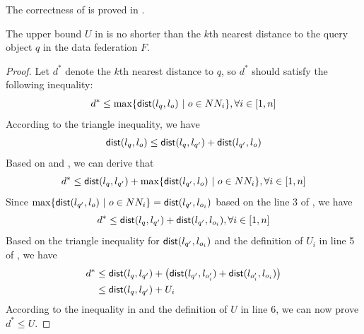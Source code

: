The correctness of  is proved in .
\begin{lemma}\label{lem:knn-UB}
    The upper bound $U$ in  is no shorter than the $k$th nearest distance to the query object $q$ in the data federation $F$.
\end{lemma}
\begin{proof}
    Let $d^*$ denote the $k$th nearest distance to $q$, so $d^*$ should satisfy the following inequality:
    \begin{equation}\label{equ:knn-UB-1}
        d^* \le \max\{\textsf{dist}(l_q, l_{o})\ |\ o \in NN_i\}, \forall i \in [1,n] 
    \end{equation}
    According to the triangle inequality, we have
    \begin{equation}\label{equ:knn-UB-2}
        \textsf{dist}(l_q, l_{o}) \le \textsf{dist}(l_q, l_{q'}) + \textsf{dist}(l_{q'}, l_{o})
    \end{equation}
    Based on  and , we can derive that
    \begin{equation*}\label{equ:knn-UB-3}
        d^* \le \textsf{dist}(l_q, l_{q'}) + \max\{\textsf{dist}(l_{q'}, l_{o})\ |\ o \in NN_i\}, \forall i \in [1,n] 
    \end{equation*}
    Since $\max\{\textsf{dist}(l_{q'}, l_{o})\ |\ o \in NN_i\} = \textsf{dist}(l_{q'}, l_{o_i})$ based on the line 3 of , we have
    \begin{equation*}\label{equ:knn-UB-4}
        d^* \le \textsf{dist}(l_q, l_{q'}) + \textsf{dist}(l_{q'}, l_{o_i}), \forall i \in [1,n] 
    \end{equation*}
    Based on the triangle inequality for $\textsf{dist}(l_{q'}, l_{o_i})$ and the definition of $U_i$ in line 5 of , we have
    \begin{align}
        d^* &\le \textsf{dist}(l_q, l_{q'}) + \big(\textsf{dist}(l_{q'}, l_{o_i'}) + \textsf{dist}(l_{o_i'}, l_{o_i}) \big)  \nonumber \\
        & \le \textsf{dist}(l_q, l_{q'}) + U_i \label{equ:knn-UB-5}
    \end{align}
    According to the inequality in  and the definition of $U$ in line 6, we can now prove $d^* \le U$.
\end{proof}


